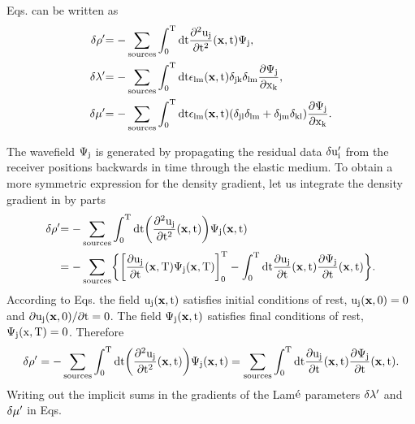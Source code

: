Eqs. can be written as
\begin{equation}
\begin{split} 
\rm{\delta \rho'} &\rm{= - \sum_{sources} \int_0^T dt \frac{\partial^2 u_j}{\partial t^2}(\mathbf{x},t) \Psi_j,}\\
\rm{\delta \lambda'} &\rm{= - \sum_{sources} \int_0^T dt \epsilon_{lm}(\mathbf{x},t) \delta_{jk} \delta_{lm} \frac{\partial \Psi_{j}}{\partial x_k},}\\
\rm{\delta \mu'} &\rm{= - \sum_{sources} \int_0^T dt \epsilon_{lm}(\mathbf{x},t) (\delta_{jl} \delta_{lm} + \delta_{jm} \delta_{kl}) \frac{\partial \Psi_{j}}{\partial x_k}.} 
\label{A3:30:3}
\end{split}
\end{equation} 

The wavefield $\rm{\Psi_j}$ is generated by propagating the residual data $\rm{\delta u_i'}$ from the receiver positions backwards in
time through the elastic medium. 
To obtain a more symmetric expression for the density gradient, let us integrate the density gradient in  by parts
\begin{equation} 
\begin{split}
\rm{\delta \rho'} &\rm{= - \sum_{sources} \int_0^T dt \biggl(\frac{\partial^2 u_j}{\partial t^2}(\mathbf{x},t)\biggr) \Psi_j (\mathbf{x},t)} \\
&\rm{= - \sum_{sources} \biggl\{\biggl[\frac{\partial u_j}{\partial t}(\mathbf{x},T) \Psi_j (\mathbf{x},T)\biggr]_0^T - \int_0^T dt \frac{\partial u_j}{\partial t}(\mathbf{x},t) \frac{\partial \Psi_j}{\partial t}(\mathbf{x},t)\biggr\}.} 
\label{A3:40}
\end{split}
\end{equation} 
According to Eqs.  the field $\rm{u_j(\mathbf{x},t)}$ satisfies initial conditions of rest, $\rm{u_j(\mathbf{x},0)=0}$ and $\rm{\partial u_j(\mathbf{x},0)/ \partial t=0}$. The field $\rm{\Psi_j(\mathbf{x},t)}$ satisfies final conditions of rest, $\rm{\Psi_j(x,T)=0}$. Therefore
\begin{equation} 
\rm{\delta \rho' = - \sum_{sources} \int_0^T dt \biggl(\frac{\partial^2 u_j}{\partial t^2}(\mathbf{x},t)\biggr) \Psi_j (\mathbf{x},t) = \sum_{sources} \int_0^T dt \frac{\partial u_j}{\partial t}(\mathbf{x},t) \frac{\partial \Psi_j}{\partial t}(\mathbf{x},t).} 
\label{A3:50}
\end{equation} 
Writing out the implicit sums in the gradients of the Lam$\rm{\acute{\rm e}}$ parameters $\rm{\delta \lambda'}$ and $\rm{\delta \mu'}$ in Eqs. 
